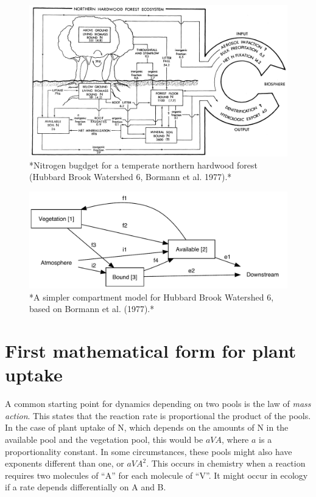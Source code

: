 \documentclass[
]{book}
\begin{document}
\begin{figure}
\includegraphics[width=1\linewidth]{figs/BormannF2} \caption{*Nitrogen bugdget for a temperate northern hardwood forest (Hubbard Brook Watershed 6, Bormann et al. 1977).*}\label{fig:hbnb}
\end{figure}

\begin{figure}
\includegraphics[width=0.9\linewidth]{figs/model3} \caption{*A simpler compartment model for Hubbard Brook Watershed 6, based on Bormann et al. (1977).*}\label{fig:hbnb3}
\end{figure}

\hypertarget{first-mathematical-form-for-plant-uptake}{%
\section{First mathematical form for plant uptake}\label{first-mathematical-form-for-plant-uptake}}

A common starting point for dynamics depending on two pools is the law of \emph{mass action}. This states that the reaction rate is proportional the product of the pools. In the case of plant uptake of N, which depends on the amounts of N in the available pool and the vegetation pool, this would be \(aVA\), where \(a\) is a proportionality constant. In some circumstances, these pools might also have exponents different than one, or \(aVA^2\). This occurs in chemistry when a reaction requires two molecules of ``A'' for each molecule of ``V''. It might occur in ecology if a rate depends differentially on A and B.
\end{document}
